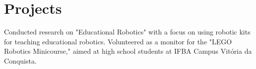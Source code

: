 \section{Projects}
  \resumeSubHeadingListStart
      {Conducted research on "Educational Robotics" with a focus on using robotic kits for teaching educational robotics.}
      {Volunteered as a monitor for the "LEGO Robotics Minicourse," aimed at high school students at IFBA Campus Vitória da Conquista.}

\resumeSubHeadingListEnd